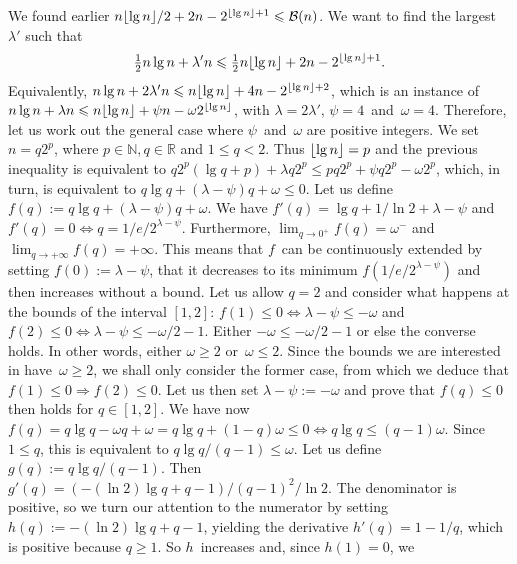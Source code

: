 We found earlier \(n\lfloor{\lg n}\rfloor/2 + 2n - 2^{\lfloor{\lg n}\rfloor+1}
\leqslant \mathcal{B}(n)\). We want to find the largest~\(\lambda'\) such
that
\[
\tfrac{1}{2}n\lg n + \lambda' n
\leqslant \tfrac{1}{2}n\lfloor{\lg n}\rfloor + 2n - 2^{\lfloor{\lg n}\rfloor+1}.
\]
Equivalently, \(n\lg n + 2\lambda' n \leqslant n\lfloor{\lg n}\rfloor + 4n -
2^{\lfloor{\lg n}\rfloor+2}\), which is an instance of \(n\lg n + \lambda n
\leqslant n\lfloor{\lg n}\rfloor + \psi n - \omega 2^{\lfloor{\lg n}\rfloor}\), with
\(\lambda = 2\lambda'\), \(\psi = 4\)~and~\(\omega = 4\). Therefore,
let us work out the general case where \(\psi\)~and~\(\omega\) are
positive integers. We set \(n=q2^p\), where \(p \in \mathbb{N}, q \in
\mathbb{R}\) and \(1 \leqslant q < 2\). Thus \(\lfloor{\lg n}\rfloor = p\) and
the previous inequality is equivalent to \(q2^p(\lg q + p) + \lambda
q2^p \leqslant pq2^p + \psi q2^p - \omega 2^p\), which, in turn, is
equivalent to \(q\lg q + (\lambda - \psi) q + \omega \leqslant 0\).
Let us define \(f(q) := q\lg q + (\lambda - \psi) q + \omega\). We
have \(f'(q) = \lg q + 1/\ln 2 + \lambda - \psi\) and \(f'(q) = 0
\Leftrightarrow q = 1/e/2^{\lambda - \psi}\). Furthermore,
\(\lim_{q\rightarrow 0^{+}}{f(q)} = \omega^{-}\) and \(\lim_{q
  \rightarrow +\infty}{f(q)} = +\infty\). This means that \(f\)~can be
continuously extended by setting \(f(0) := \lambda - \psi\), that it
decreases to its minimum \(f(1/e/2^{\lambda-\psi})\) and then
increases without a bound. Let us allow \({q=2}\) and consider what
happens at the bounds of the interval \([1,2]\): \(f(1) \leqslant 0
\Leftrightarrow \lambda - \psi \leqslant -\omega\) and \(f(2)
\leqslant 0 \Leftrightarrow \lambda - \psi \leqslant -\omega/2 - 1\).
Either \(-\omega \leqslant -\omega/2 - 1\) or else the converse
holds. In other words, either \(\omega \geqslant 2\) or~\(\omega
\leqslant 2\). Since the bounds we are interested in have~\(\omega
\geqslant 2\), we shall only consider the former case, from which we
deduce that \(f(1) \leqslant 0 \Rightarrow f(2) \leqslant 0\). Let us
then set \(\lambda - \psi := -\omega\) and prove that \(f(q) \leqslant
0\) then holds for \(q \in [1,2]\). We have now \(f(q) = q\lg q -
\omega q + \omega = q\lg q +(1-q)\omega \leqslant 0 \Leftrightarrow
q\lg q \leqslant (q-1)\omega\). Since \(1 \leqslant q\), this is
equivalent to \(q\lg q/(q-1) \leqslant \omega\). Let us define \(g(q)
:= q\lg q/(q-1)\). Then \(g'(q) = (-(\ln 2)\lg q + q - 1)/(q-1)^2/\ln
2\). The denominator is positive, so we turn our attention to the
numerator by setting \(h(q) := -(\ln 2)\lg q + q - 1\), yielding the
derivative \(h'(q) = 1 - 1/q\), which is positive because \({q
  \geqslant 1}\). So \(h\)~increases and, since \({h(1) = 0}\), we
